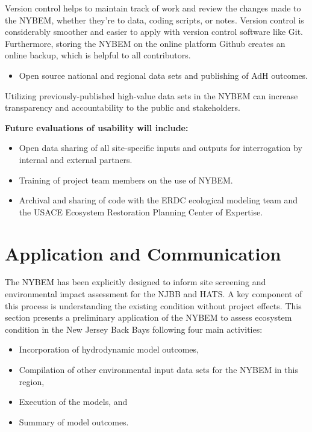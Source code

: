 \documentclass[
]{book}
\providecommand{\tightlist}{%
  \setlength{\itemsep}{0pt}\setlength{\parskip}{0pt}}
\begin{document}
Version control helps to maintain track of work and review the changes made to the NYBEM, whether they're to data, coding scripts, or notes. Version control is considerably smoother and easier to apply with version control software like Git. Furthermore, storing the NYBEM on the online platform Github creates an online backup, which is helpful to all contributors.

\begin{itemize}
\tightlist
\item
  Open source national and regional data sets and publishing of AdH outcomes.
\end{itemize}

Utilizing previously-published high-value data sets in the NYBEM can increase transparency and accountability to the public and stakeholders.

\textbf{Future evaluations of usability will include:}

\begin{itemize}
\item
  Open data sharing of all site-specific inputs and outputs for interrogation by internal and external partners.
\item
  Training of project team members on the use of NYBEM.
\item
  Archival and sharing of code with the ERDC ecological modeling team and the USACE Ecosystem Restoration Planning Center of Expertise.
\end{itemize}

\hypertarget{application-and-communication}{%
\chapter{Application and Communication}\label{application-and-communication}}

The NYBEM has been explicitly designed to inform site screening and environmental impact assessment for the NJBB and HATS. A key component of this process is understanding the existing condition without project effects. This section presents a preliminary application of the NYBEM to assess ecosystem condition in the New Jersey Back Bays following four main activities:

\begin{itemize}
\tightlist
\item
  Incorporation of hydrodynamic model outcomes,\\
\item
  Compilation of other environmental input data sets for the NYBEM in this region,\\
\item
  Execution of the models, and\\
\item
  Summary of model outcomes.
\end{itemize}
\end{document}
